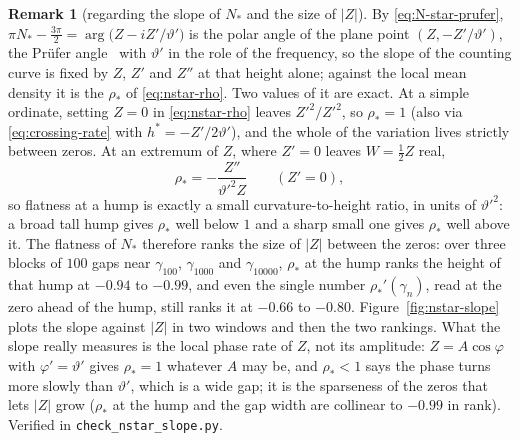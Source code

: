 \documentclass[11pt]{article}
\theoremstyle{definition}
\newtheorem{remark}[theorem]{Remark}
\begin{document}
\begin{remark}[regarding the slope of $N_{\ast}$ and the size of $|Z|$]
\label{rem:nstar-slope}
By \eqref{eq:N-star-prufer},
$\pi N_{\ast}-\tfrac{3\pi}{2}=\arg\bigl(Z-iZ'/\vartheta'\bigr)$ is the polar angle
of the plane point $(Z,-Z'/\vartheta')$, the Pr\"ufer
angle~\cite{Prufer1926} with $\vartheta'$ in the role of the frequency, so the
slope of the counting curve is fixed by $Z$, $Z'$ and $Z''$ at that height
alone; against the local mean density it is the $\rho_{\ast}$ of
\eqref{eq:nstar-rho}. Two values of it are exact. At a simple ordinate,
setting $Z=0$ in \eqref{eq:nstar-rho} leaves $Z'^2/Z'^2$, so $\rho_{\ast}=1$
(also via \eqref{eq:crossing-rate} with $h^{\ast}=-Z'/2\vartheta'$), and the
whole of the variation lives strictly between zeros. At an extremum of $Z$,
where $Z'=0$ leaves $W=\tfrac12 Z$ real,
\begin{equation}\label{eq:rho-peak}
\rho_{\ast}=-\frac{Z''}{\vartheta'^2 Z}\qquad(Z'=0),
\end{equation}
so flatness at a hump is exactly a small curvature-to-height ratio, in units of
$\vartheta'^2$: a broad tall hump gives $\rho_{\ast}$ well below $1$ and a sharp small one
gives $\rho_{\ast}$ well above it. The flatness of $N_{\ast}$ therefore ranks the
size of $|Z|$ between the zeros: over three blocks of $100$ gaps near
$\gamma_{100}$, $\gamma_{1000}$ and $\gamma_{10000}$, $\rho_{\ast}$ at the hump
ranks the height of that hump at $-0.94$ to $-0.99$, and even the single number
$\rho_{\ast}'(\gamma_n)$, read at the zero ahead of the hump, still ranks it at
$-0.66$ to $-0.80$. Figure~\ref{fig:nstar-slope} plots the slope against $|Z|$
in two windows and then the two rankings. What the slope really measures is the
local phase rate of $Z$, not its amplitude: $Z=A\cos\varphi$ with
$\varphi'=\vartheta'$ gives $\rho_{\ast}=1$ whatever $A$ may be, and $\rho_{\ast}<1$
says the phase turns more slowly than $\vartheta'$, which is a wide gap; it is
the sparseness of the zeros that lets $|Z|$ grow ($\rho_{\ast}$ at the hump and
the gap width are collinear to $-0.99$ in rank).
Verified in \texttt{check\_nstar\_slope.py}.
\end{remark}
\end{document}
